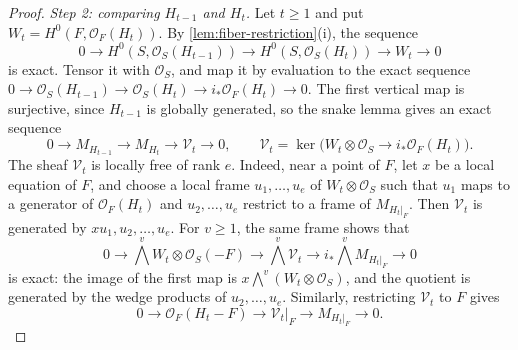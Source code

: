 \documentclass[11pt,reqno]{amsart}
\numberwithin{equation}{section}
\theoremstyle{remark}
\newcommand{\sshf}[1]{\mathcal{O}_{#1}}
\newcommand{\shf}[1]{\mathscr{#1}}
\begin{document}
\begin{proof}
\smallskip\noindent\emph{Step 2: comparing \(H_{t-1}\) and \(H_t\).} Let \(t\geq1\) and put \(W_t=H^0(F,\sshf{F}(H_t))\). By \cref{lem:fiber-restriction}\textup{(i)}, the sequence
\[
 0\longrightarrow H^0(S,\sshf{S}(H_{t-1}))\longrightarrow H^0(S,\sshf{S}(H_t))\longrightarrow W_t\longrightarrow0
\]
is exact. Tensor it with \(\sshf{S}\), and map it by evaluation to the exact sequence \(0\to\sshf{S}(H_{t-1})\to\sshf{S}(H_t)\to i_*\sshf{F}(H_t)\to0\). The first vertical map is surjective, since \(H_{t-1}\) is globally generated, so the snake lemma gives an exact sequence
\begin{equation}\label{eq:elementary-kernel-comparison}
 0\longrightarrow M_{H_{t-1}}\longrightarrow M_{H_t}
 \longrightarrow\shf{V}_t\longrightarrow0,
 \qquad
 \shf{V}_t=\ker\bigl(W_t\otimes\sshf{S}\longrightarrow i_*\sshf{F}(H_t)\bigr).
\end{equation}
The sheaf \(\shf{V}_t\) is locally free of rank \(e\). Indeed, near a point of \(F\), let \(x\) be a local equation of \(F\), and choose a local frame \(u_1,\dots,u_e\) of \(W_t\otimes\sshf{S}\) such that \(u_1\) maps to a generator of \(\sshf{F}(H_t)\) and \(u_2,\dots,u_e\) restrict to a frame of \(M_{H_t|_F}\). Then \(\shf{V}_t\) is generated by \(xu_1,u_2,\dots,u_e\). For \(v\geq1\), the same frame shows that
\begin{equation}\label{eq:elementary-exterior}
 0\longrightarrow\bigwedge^vW_t\otimes\sshf{S}(-F)
 \longrightarrow\bigwedge^v\shf{V}_t
 \longrightarrow i_*\bigwedge^vM_{H_t|_F}\longrightarrow0
\end{equation}
is exact: the image of the first map is \(x\bigwedge^v(W_t\otimes\sshf{S})\), and the quotient is generated by the wedge products of \(u_2,\dots,u_e\). Similarly, restricting \(\shf{V}_t\) to \(F\) gives
\begin{equation}\label{eq:elementary-on-F}
 0\longrightarrow\sshf{F}(H_t-F)\longrightarrow\shf{V}_t|_F\longrightarrow M_{H_t|_F}\longrightarrow0.
\end{equation}


\end{proof}
\end{document}
